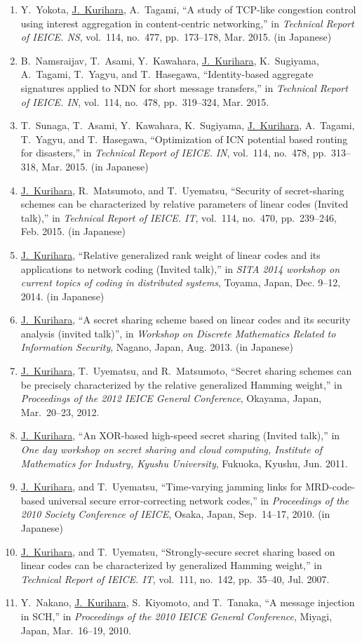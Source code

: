 \begin{enumerate}
 \item Y.~Yokota, \underline{J.~Kurihara}, A.~Tagami, ``A study of TCP-like congestion control using interest aggregation in content-centric networking,'' in \textit{Technical Report of IEICE. NS}, vol.~114, no.~477, pp.~173--178, Mar. 2015. (in Japanese)
 \item B.~Namsraijav, T.~Asami, Y.~Kawahara, \underline{J.~Kurihara}, K.~Sugiyama, A.~Tagami, T.~Yagyu, and T.~Hasegawa, ``Identity-based aggregate signatures applied to NDN for short message transfers,'' in \textit{Technical Report of IEICE. IN}, vol.~114, no.~478, pp.~319--324, Mar. 2015.
 \item T.~Sunaga, T.~Asami, Y.~Kawahara, K.~Sugiyama, \underline{J.~Kurihara}, A.~Tagami, T.~Yagyu, and T.~Hasegawa, ``Optimization of ICN potential based routing for disasters,'' in \textit{Technical Report of IEICE. IN}, vol.~114, no.~478, pp.~313--318, Mar. 2015. (in Japanese)
 \item \underline{J.~Kurihara}, R.~Matsumoto, and T.~Uyematsu, ``Security of secret-sharing schemes can be characterized by relative parameters of linear codes (Invited talk),'' in \textit{Technical Report of IEICE. IT}, vol.~114, no.~470, pp.~239--246, Feb. 2015. (in Japanese)
 \item \underline{J.~Kurihara}, ``Relative generalized rank weight of linear codes and its applications to network coding (Invited talk),'' in \textit{SITA 2014 workshop on current topics of coding in distributed systems}, Toyama, Japan, Dec. 9--12, 2014. (in Japanese)
 \item \underline{J.~Kurihara}, ``A secret sharing scheme based on linear codes and its security analysis (invited talk)'', in \textit{Workshop on Discrete Mathematics Related to Information Security}, Nagano, Japan, Aug. 2013. (in Japanese)
 \item \underline{J.~Kurihara}, T.~Uyematsu, and R.~Matsumoto,
       ``Secret sharing schemes can be precisely
       characterized by the relative generalized Hamming weight,''
       in \textit{Proceedings of the 2012 IEICE General Conference},
       Okayama, Japan, Mar.~20--23, 2012.
 \item \underline{J.~Kurihara}, ``An XOR-based high-speed secret sharing (Invited talk),'' in \textit{One day workshop on secret sharing and cloud computing, Institute of Mathematics for Industry, Kyushu University}, Fukuoka, Kyushu, Jun. 2011.
 \item \underline{J.~Kurihara}, and T.~Uyematsu, ``Time-varying jamming links for MRD-code-based universal secure error-correcting network codes,'' in \textit{Proceedings of the 2010 Society Conference of IEICE}, Osaka, Japan, Sep.~14--17, 2010. (in Japanese)
 \item \underline{J.~Kurihara}, and T.~Uyematsu, ``Strongly-secure secret
       sharing based on linear codes can be characterized by generalized
       Hamming weight,'' in \textit{Technical Report of IEICE. IT},
       vol.~111, no.~142, pp.~35--40, Jul. 2007.
 \item Y.~Nakano, \underline{J.~Kurihara}, S.~Kiyomoto, and T.~Tanaka, ``A message injection in SCH,'' in \textit{Proceedings of the 2010 IEICE General Conference}, Miyagi, Japan, Mar.~16--19, 2010.


\end{enumerate}
